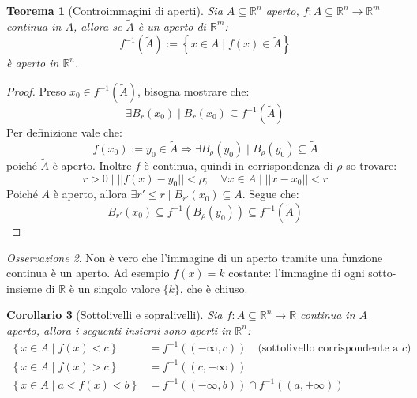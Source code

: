 \documentclass[11pt, a4paper, openright]{book}
\theoremstyle{plain}
\newtheorem{teorema}{Teorema}[section]
\newtheorem{corollario}[teorema]{Corollario}
\theoremstyle{definition}
\theoremstyle{remark}
\newtheorem{osservazione}[teorema]{Osservazione}
\begin{document}
\begin{teorema}[Controimmagini di aperti]
    Sia $A \subseteq \mathbb{R}^n$ aperto, $f: A \subseteq \mathbb{R}^n \longrightarrow \mathbb{R}^m$ continua in $A$, allora se $\tilde{A}$ è un aperto di $\mathbb{R}^m$:
    \begin{equation}
        f^{-1}(\tilde{A}) := \left\{x \in A \mid f(x) \in \tilde{A}\right\}
    \end{equation}
    è aperto in $\mathbb{R}^n$.
\end{teorema}
\begin{proof}
    Preso $x_0 \in f^{-1}(\tilde{A})$, bisogna mostrare che:
    \begin{equation}
        \exists B_r(x_0) \mid B_r(x_0) \subseteq f^{-1}(\tilde{A})
    \end{equation}
    Per definizione vale che:
    \begin{equation}
        f(x_0) := y_0 \in \tilde{A} \Longrightarrow \exists B_\rho(y_0) \mid B_\rho(y_0) \subseteq \tilde{A}
    \end{equation}
    poiché $\tilde{A}$ è aperto. Inoltre $f$ è continua, quindi in corrispondenza di $\rho$ so trovare:
    \begin{equation}
        r > 0 \mid ||f(x) - y_0|| < \rho; \quad \forall x \in A \mid ||x - x_0|| < r
    \end{equation}
    Poiché $A$ è aperto, allora $\exists r' \leq r \mid B_{r'}(x_0) \subseteq A$. Segue che:
    \begin{equation}
        B_{r'}(x_0) \subseteq f^{-1}(B_\rho(y_0)) \subseteq f^{-1}(\tilde{A})
    \end{equation}
\end{proof}

\begin{osservazione}
    Non è vero che l'immagine di un aperto tramite una funzione continua è un aperto. Ad esempio $f(x) = k$ costante: l'immagine di ogni sotto-insieme di $\mathbb{R}$ è un singolo valore $\{k\}$, che è chiuso.
\end{osservazione}

\begin{corollario}[Sottolivelli e sopralivelli]
    Sia $f: A \subseteq \mathbb{R}^n \longrightarrow \mathbb{R}$ continua in $A$ aperto, allora i seguenti insiemi sono aperti in $\mathbb{R}^n$:
    \begin{equation}
        \begin{aligned}
            \left\{x \in A \mid f(x) < c\right\} &= f^{-1}((-\infty, c)) \quad \text{(sottolivello corrispondente a } c\text{)} \\
            \left\{x \in A \mid f(x) > c\right\} &= f^{-1}((c, +\infty)) \\
            \left\{x \in A \mid a < f(x) < b\right\} &= f^{-1}((-\infty, b)) \cap f^{-1}((a, +\infty))
        \end{aligned}
    \end{equation}
\end{corollario}
\end{document}
